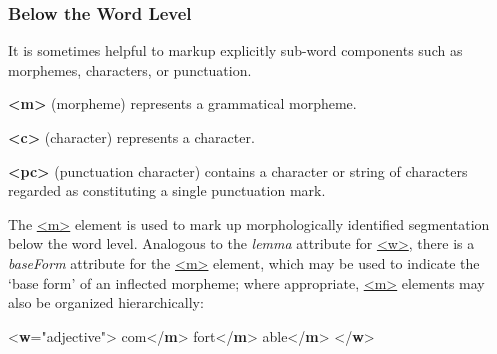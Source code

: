 \subsubsection[{Below the Word Level}]{Below the Word Level}\label{AIPC}\par
It is sometimes helpful to markup explicitly sub-word components such as morphemes, characters, or punctuation. 
\begin{sansreflist}
  
\item [\textbf{<m>}] (morpheme) represents a grammatical morpheme.
\item [\textbf{<c>}] (character) represents a character.
\item [\textbf{<pc>}] (punctuation character) contains a character or string of characters regarded as constituting a single punctuation mark.
\end{sansreflist}
\par
The \hyperref[TEI.m]{<m>} element is used to mark up morphologically identified segmentation below the word level. Analogous to the {\itshape lemma} attribute for \hyperref[TEI.w]{<w>}, there is a {\itshape baseForm} attribute for the \hyperref[TEI.m]{<m>} element, which may be used to indicate the ‘base form’ of an inflected morpheme; where appropriate, \hyperref[TEI.m]{<m>} elements may also be organized hierarchically: \par\bgroup{}\exampleFont \begin{shaded}\noindent\mbox{}{<\textbf{w}\hspace*{1em}{type}="{adjective}">}\mbox{}\newline 
{}\mbox{}\newline 
\hspace*{1em}com{</\textbf{m}>}\mbox{}\newline 
\hspace*{1em}fort{</\textbf{m}>}\mbox{}\newline 
{}\mbox{}\newline 
{}able{</\textbf{m}>}\mbox{}\newline 
{</\textbf{w}>}\end{shaded}\egroup\par \par
